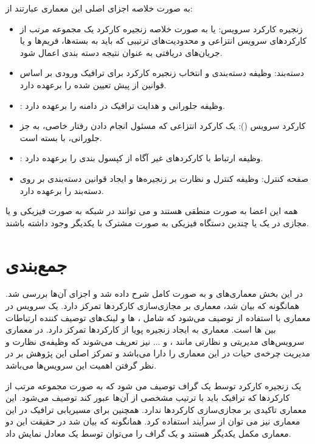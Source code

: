 به صورت خلاصه اجزای اصلی این معماری عبارتند از:
\begin{itemize}
    \item زنجیره کارکرد سرویس: یا به صورت خلاصه زنجیره کارکرد یک مجموعه مرتب از کارکردهای سرویس انتزاعی و محدودیت‌های ترتیبی که باید به بسته‌ها، فریم‌ها و یا جریان‌های دریافتی به عنوان نتیجه دسته بندی اعمال شود.
    \item دسته‌بند: وظیفه دسته‌بندی و انتخاب زنجیره کارکرد برای ترافیک ورودی بر اساس قوانین از پیش تعیین شده را برعهده دارد.
    \item {}: وظیفه جلورانی و هدایت ترافیک در دامنه  را برعهده دارد.
    \item کارکرد سرویس (): یک کارکرد انتزاعی که مسئول انجام دادن رفتار خاصی، به جز جلورانی، با بسته است.
    \item {}: وظیفه ارتباط با کارکردهای غیر آگاه از کپسول بندی  را برعهده دارد.
    \item صفحه کنترل: وظیفه کنترل و نظارت بر زنجیره‌ها و ایجاد قوانین دسته‌بندی بر روی دسته‌بند را برعهده دارد.
\end{itemize}
همه این اعضا به صورت منطقی هستند و می توانند در شبکه به صورت فیزیکی و یا مجازی در یک یا چندین دستگاه فیزیکی به صورت مشترک با یکدیگر وجود داشته باشند.

\section{جمع‌بندی}
در این بخش معماری‌های  و  به صورت کامل شرح داده شد و اجزای آن‌ها بررسی شد.
همانگونه که بیان شد، معماری  بر مجازی‌سازی کارکردها تمرکز دارد.
یک سرویس در معماری  با استفاده از  توصیف می‌شود که
شامل ، ‌ها و لینک‌های توصیف کننده ارتباطات بین ‌ها است.
معماری  به ایجاد زنجیره پویا از کارکردها تمرکز دارد.
در معماری  سرویس‌های مدیریتی و نظارتی مانند ،  و ... نیز تعریف می‌شوند که
وظیفه‌ی نظارت و مدیریت چرخه‌ی حیات در این معماری را دارا می‌باشد و تمرکز اصلی این پژوهش بر در نظر گرفتن اهمیت این سرویس‌ها می‌باشد.

یک زنجیره کارکرد توسط یک گراف  توصیف می شود که
به صورت مجموعه مرتب از کارکردها که ترافیک باید با ترتیب مشخصی از آن‌ها عبور کند توصیف می‌‌شود.
این معماری تاکیدی بر مجازی‌سازی کارکردها ندارد.
همچنین برای مسیریابی ترافیک در این معماری نیز می توان از سرآیند  استفاده کرد.
همانگونه که بیان شد در حقیقت این دو معماری مکمل یکدیگر هستند و
یک گراف  را می‌توان توسط یک  معادل نمایش داد.